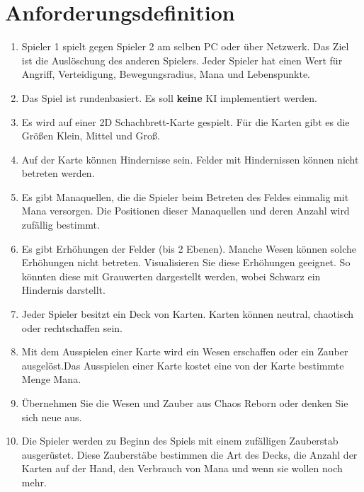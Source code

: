 \documentclass[a4paper,12pt]{scrartcl}
\begin{document}
	\section{Anforderungsdefinition}
	\begin{enumerate}
		\item Spieler 1 spielt gegen Spieler 2 am selben PC oder über Netzwerk. Das Ziel ist die Auslöschung des anderen Spielers. Jeder Spieler hat einen Wert für Angriff, Verteidigung, Bewegungsradius, Mana und Lebenspunkte.
		
		\item Das Spiel ist rundenbasiert. Es soll \textbf{keine} KI implementiert werden.
		
		\item Es wird auf einer 2D Schachbrett-Karte gespielt. Für die Karten gibt es die Größen Klein, Mittel und Groß.
		
		\item Auf der Karte können Hindernisse sein. Felder mit Hindernissen können nicht betreten werden.
		
		\item Es gibt Manaquellen, die die Spieler beim Betreten des Feldes einmalig mit Mana versorgen. Die Positionen dieser Manaquellen und deren Anzahl wird zufällig bestimmt.
		
		\item Es gibt Erhöhungen der Felder (bis 2 Ebenen). Manche Wesen können solche Erhöhungen nicht betreten. Visualisieren Sie diese Erhöhungen geeignet. So könnten diese mit Grauwerten dargestellt werden, wobei Schwarz ein Hindernis darstellt.
		
		\item Jeder Spieler besitzt ein Deck von Karten. Karten können neutral, chaotisch oder rechtschaffen sein.
		
		\item Mit dem Ausspielen einer Karte wird ein Wesen erschaffen oder ein Zauber ausgelöst.Das Ausspielen einer Karte kostet eine von der Karte bestimmte Menge Mana.
		
		\item Übernehmen Sie die Wesen und Zauber aus Chaos Reborn oder denken Sie sich neue aus.
		
		\item Die Spieler werden zu Beginn des Spiels mit einem zufälligen Zauberstab ausgerüstet. Diese Zauberstäbe bestimmen die Art des Decks, die Anzahl der Karten auf der Hand, den Verbrauch von Mana und wenn sie wollen noch mehr.
		

\end{enumerate}
\end{document}
